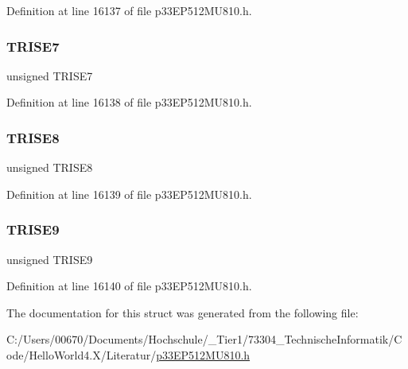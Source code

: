 Definition at line 16137 of file p33\+E\+P512\+M\+U810.\+h.

\mbox{\label{structtag_t_r_i_s_e_b_i_t_s_a2d7d9f93d9f8fb115476c18c8493fdfc}} 
\subsubsection{\texorpdfstring{T\+R\+I\+S\+E7}{TRISE7}}
{\footnotesize\ttfamily unsigned T\+R\+I\+S\+E7}



Definition at line 16138 of file p33\+E\+P512\+M\+U810.\+h.

\mbox{\label{structtag_t_r_i_s_e_b_i_t_s_a43d8ab47fb27f479f643f088b5042214}} 
\subsubsection{\texorpdfstring{T\+R\+I\+S\+E8}{TRISE8}}
{\footnotesize\ttfamily unsigned T\+R\+I\+S\+E8}



Definition at line 16139 of file p33\+E\+P512\+M\+U810.\+h.

\mbox{\label{structtag_t_r_i_s_e_b_i_t_s_aafc56ea643ddfb4897094b153c117587}} 
\subsubsection{\texorpdfstring{T\+R\+I\+S\+E9}{TRISE9}}
{\footnotesize\ttfamily unsigned T\+R\+I\+S\+E9}



Definition at line 16140 of file p33\+E\+P512\+M\+U810.\+h.



The documentation for this struct was generated from the following file\+:\begin{DoxyCompactItemize}
\item 
C\+:/\+Users/00670/\+Documents/\+Hochschule/\+\_\+\+Tier1/73304\+\_\+\+Technische\+Informatik/\+Code/\+Hello\+World4.\+X/\+Literatur/\hyperlink{p33_e_p512_m_u810_8h}{p33\+E\+P512\+M\+U810.\+h}\end{DoxyCompactItemize}
